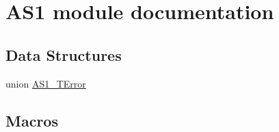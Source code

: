 \hypertarget{group___a_s1__module}{}\section{A\+S1 module documentation}
\label{group___a_s1__module}
\subsection*{Data Structures}
\begin{DoxyCompactItemize}
\item 
union \hyperlink{union_a_s1___t_error}{A\+S1\+\_\+\+T\+Error}
\end{DoxyCompactItemize}
\subsection*{Macros}
